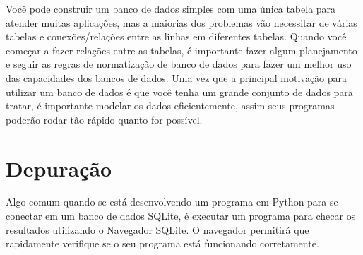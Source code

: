 
Você pode construir um banco de dados simples com uma única tabela para
atender muitas aplicações, mas a maiorias dos problemas vão necessitar de
várias tabelas e conexões/relações entre as linhas em diferentes tabelas.
Quando você começar a fazer relações entre as tabelas, é importante fazer
algum planejamento e seguir as regras de normatização de banco de dados
para fazer um melhor uso das capacidades dos bancos de dados. Uma vez que a
principal motivação para utilizar um banco de dados é que você tenha um grande
conjunto de dados para tratar, é importante modelar os dados eficientemente,
assim seus programas poderão rodar tão rápido quanto for possível.

\section{Depuração}

Algo comum quando se está desenvolvendo um programa em Python para se conectar
em um banco de dados SQLite, é executar um programa para checar os resultados
utilizando o Navegador SQLite. O navegador permitirá que rapidamente verifique
se o seu programa está funcionando corretamente.


